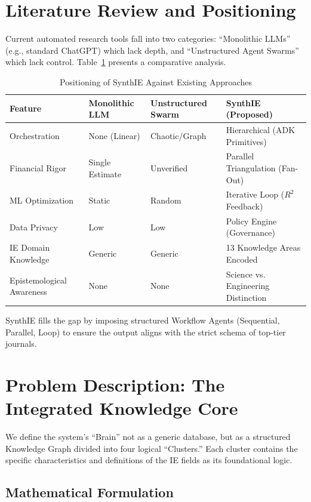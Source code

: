 \documentclass[12pt,a4paper]{article}
\begin{document}
\section{Literature Review and Positioning}

Current automated research tools fall into two categories: ``Monolithic LLMs'' (e.g., standard ChatGPT) which lack depth, and ``Unstructured Agent Swarms'' which lack control. Table~\ref{tab:positioning} presents a comparative analysis.

\begin{table}[h]
\centering
\caption{Positioning of SynthIE Against Existing Approaches}
\label{tab:positioning}
\begin{tabular}{@{}llll@{}}
\toprule
\textbf{Feature} & \textbf{Monolithic LLM} & \textbf{Unstructured Swarm} & \textbf{SynthIE (Proposed)} \\ \midrule
Orchestration & None (Linear) & Chaotic/Graph & Hierarchical (ADK Primitives) \\
Financial Rigor & Single Estimate & Unverified & Parallel Triangulation (Fan-Out) \\
ML Optimization & Static & Random & Iterative Loop ($R^2$ Feedback) \\
Data Privacy & Low & Low & Policy Engine (Governance) \\
IE Domain Knowledge & Generic & Generic & 13 Knowledge Areas Encoded \\
Epistemological Awareness & None & None & Science vs. Engineering Distinction \\ \bottomrule
\end{tabular}
\end{table}

SynthIE fills the gap by imposing structured Workflow Agents (Sequential, Parallel, Loop) to ensure the output aligns with the strict schema of top-tier journals.

\section{Problem Description: The Integrated Knowledge Core}

We define the system's ``Brain'' not as a generic database, but as a structured Knowledge Graph divided into four logical ``Clusters.'' Each cluster contains the specific characteristics and definitions of the IE fields as its foundational logic.

\subsection{Mathematical Formulation}
\end{document}
